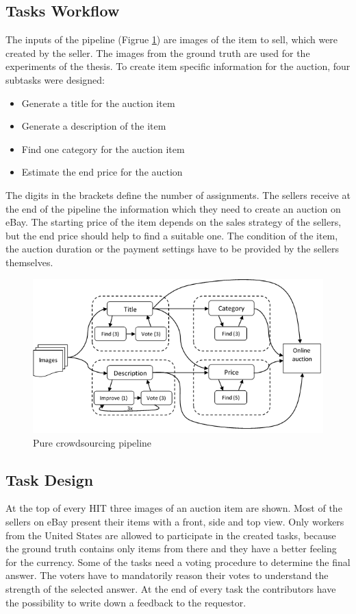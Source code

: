 \subsection{Tasks Workflow}
The inputs of the pipeline (Figrue \ref{purePipeline}) are images of the item to sell, which were created by the seller. The images from the ground truth are used for the experiments of the thesis. To create item specific information for the auction, four subtasks were designed: 
\begin{itemize}
	\item Generate a title for the auction item
	\item Generate a description of the item
	\item Find one category for the auction item  
	\item Estimate the end price for the auction  
\end{itemize}
The digits in the brackets define the number of assignments. The sellers receive at the end of the pipeline the information which they need to create an auction on eBay. The starting price of the item depends on the sales strategy of the sellers, but the end price should help to find a suitable one. The condition of the item, the auction duration or the payment settings have to be provided by the sellers themselves.
\begin{figure}[h!]
\centering
\includegraphics[scale=0.8]{images/pipelines/Pure_Pipeline.png}
\caption{Pure crowdsourcing pipeline}
\label{purePipeline}
\end{figure}

\subsection{Task Design}
At the top of every HIT three images of an auction item are shown. Most of the sellers on eBay present their items with a front, side and top view. Only workers from the United States are allowed to participate in the created tasks, because the ground truth contains only items from there and they have a better feeling for the currency. Some of the tasks need a voting procedure to determine the final answer. The voters have to mandatorily reason their votes to understand the strength of the selected answer. At the end of every task the contributors have the possibility to write down a feedback to the requestor.

